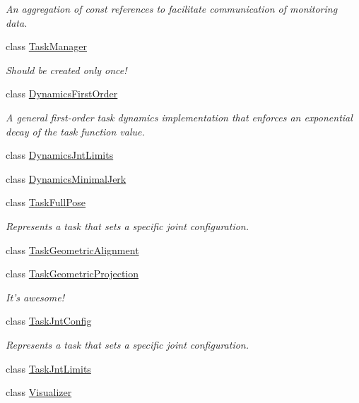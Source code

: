 \begin{DoxyCompactItemize}
\begin{DoxyCompactList}\small\item\em An aggregation of const references to facilitate communication of monitoring data. \end{DoxyCompactList}\item 
class \hyperlink{classhiqp_1_1TaskManager}{Task\-Manager}
\begin{DoxyCompactList}\small\item\em Should be created only once! \end{DoxyCompactList}\item 
class \hyperlink{classhiqp_1_1DynamicsFirstOrder}{Dynamics\-First\-Order}
\begin{DoxyCompactList}\small\item\em A general first-\/order task dynamics implementation that enforces an exponential decay of the task function value. \end{DoxyCompactList}\item 
class \hyperlink{classhiqp_1_1DynamicsJntLimits}{Dynamics\-Jnt\-Limits}
\item 
class \hyperlink{classhiqp_1_1DynamicsMinimalJerk}{Dynamics\-Minimal\-Jerk}
\item 
class \hyperlink{classhiqp_1_1TaskFullPose}{Task\-Full\-Pose}
\begin{DoxyCompactList}\small\item\em Represents a task that sets a specific joint configuration. \end{DoxyCompactList}\item 
class \hyperlink{classhiqp_1_1TaskGeometricAlignment}{Task\-Geometric\-Alignment}
\item 
class \hyperlink{classhiqp_1_1TaskGeometricProjection}{Task\-Geometric\-Projection}
\begin{DoxyCompactList}\small\item\em It's awesome! \end{DoxyCompactList}\item 
class \hyperlink{classhiqp_1_1TaskJntConfig}{Task\-Jnt\-Config}
\begin{DoxyCompactList}\small\item\em Represents a task that sets a specific joint configuration. \end{DoxyCompactList}\item 
class \hyperlink{classhiqp_1_1TaskJntLimits}{Task\-Jnt\-Limits}
\item 
class \hyperlink{classhiqp_1_1Visualizer}{Visualizer}
\end{DoxyCompactItemize}
